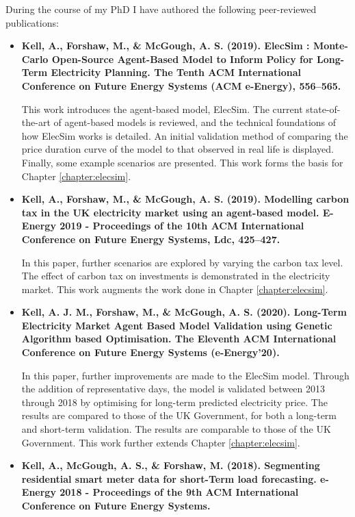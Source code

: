During the course of my PhD I have authored the following peer-reviewed publications:	

\begin{itemize}
	
	\item[\textbf{\cite{Kell}}] \textbf{Kell, A., Forshaw, M., \& McGough, A. S. (2019). ElecSim : Monte-Carlo Open-Source Agent-Based Model to Inform Policy for Long-Term Electricity Planning. The Tenth ACM International Conference on Future Energy Systems (ACM e-Energy), 556–565.}
	
	This work introduces the agent-based model, ElecSim. The current state-of-the-art of agent-based models is reviewed, and the technical foundations of how ElecSim works is detailed. An initial validation method of comparing the price duration curve of the model to that observed in real life is displayed. Finally, some example scenarios are presented. This work forms the basis for Chapter \ref{chapter:elecsim}.
	
	\item[\textbf{\cite{Kell2019a}}] \textbf{Kell, A., Forshaw, M., \& McGough, A. S. (2019). Modelling carbon tax in the UK electricity market using an agent-based model. E-Energy 2019 - Proceedings of the 10th ACM International Conference on Future Energy Systems, Ldc, 425–427. }
	
	In this paper, further scenarios are explored by varying the carbon tax level. The effect of carbon tax on investments is demonstrated in the electricity market. This work augments the work done in Chapter \ref{chapter:elecsim}.
	
	
	\item[\textbf{\cite{Kell2020}}] \textbf{Kell, A. J. M., Forshaw, M., \& McGough, A. S. (2020). Long-Term Electricity Market Agent Based Model Validation using Genetic Algorithm based Optimisation. The Eleventh ACM International Conference on Future Energy Systems (e-Energy’20).}
	
	In this paper, further improvements are made to the ElecSim model. Through the addition of representative days, the model is validated between 2013 through 2018 by optimising for long-term predicted electricity price. The results are compared to those of the UK Government, for both a long-term and short-term validation. The results are comparable to those of the UK Government. This work further extends Chapter \ref{chapter:elecsim}.
	
	\item[\textbf{\cite{Kell2018a}}] \textbf{Kell, A., McGough, A. S., \& Forshaw, M. (2018). Segmenting residential smart meter data for short-Term load forecasting. e-Energy 2018 - Proceedings of the 9th ACM International Conference on Future Energy Systems.}
	

\end{itemize}
